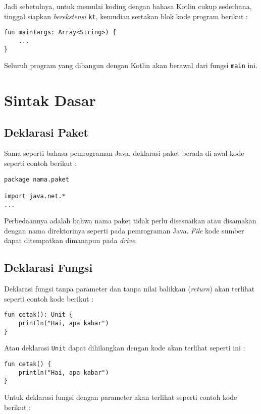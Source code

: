 Jadi sebetulnya, untuk memulai koding dengan bahasa Kotlin cukup sederhana, tinggal siapkan \textit{berekstensi} \texttt{kt}, kemudian sertakan blok kode program berikut :

\begin{lstlisting}
fun main(args: Array<String>) {
	...
}
\end{lstlisting}

Seluruh program yang dibangun dengan Kotlin akan berawal dari fungsi \texttt{main} ini.

\section{Sintak Dasar}

\subsection{Deklarasi Paket}

Sama seperti bahasa pemrograman Java, deklarasi paket berada di awal kode seperti contoh berikut :

\begin{lstlisting}
package nama.paket

import java.net.*
...
\end{lstlisting}

Perbedaannya adalah bahwa nama paket tidak perlu disesuaikan atau disamakan dengan nama direktorinya seperti pada pemrograman Java. \textit{File} kode sumber dapat ditempatkan dimanapun pada \textit{drive}.

\subsection{Deklarasi Fungsi}

Deklarasi fungsi tanpa parameter dan tanpa nilai balikkan (\textit{return}) akan terlihat seperti contoh kode berikut :

\begin{lstlisting}
fun cetak(): Unit {
	println("Hai, apa kabar")
}
\end{lstlisting}

Atau deklarasi \texttt{Unit} dapat dihilangkan dengan kode akan terlihat seperti ini :

\begin{lstlisting}
fun cetak() {
	println("Hai, apa kabar")
}
\end{lstlisting}

Untuk deklarasi fungsi dengan parameter akan terlihat seperti contoh kode berikut :

